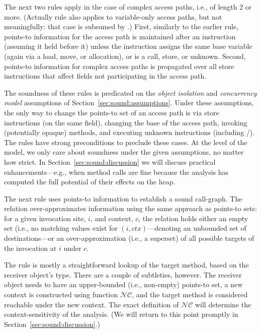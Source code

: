 The next two rules apply in the case of complex access paths, i.e., of length 2 or more. (Actually rule  also applies to variable-only access paths, but not meaningfully: that case is subsumed by .) First, similarly to the earlier rule, points-to information for the access path is maintained after an instruction (assuming it held before it) unless the instruction assigns the same base variable (again via a load, move, or allocation), or is a call, store, or unknown. Second, points-to information for complex access paths is propagated over all store instructions that affect fields not participating in the access path.

The soundness of these rules is predicated on the \emph{object isolation} and \emph{concurrency model} assumptions of Section~\ref{sec:sound:assumptions}. Under these assumptions, the only way to change the points-to set of an access path is via store instructions (on the same field), changing the base of the access path, invoking (potentially opaque) methods, and executing unknown instructions (including /). The rules have strong preconditions to preclude these cases. At the level of the model, we only care about soundness under the given assumptions, no matter how strict. In Section~\ref{sec:sound:discussion} we will discuss practical enhancements---e.g., when method calls are fine because the analysis has computed the full potential of their effects on the heap.


The next rule uses points-to information to establish a sound call-graph. The  relation  over-approximates information using the same approach as points-to sets: for a given invocation site, $i$, and context, $c$, the relation holds either an empty set (i.e., no matching values exist for $(i, ctx)$---denoting an unbounded set of destinations---or an over-approximation (i.e., a superset) of all possible targets of the invocation at $i$ under $c$.

The rule is mostly a straightforward lookup of the target method, based on the receiver object's type. There are a couple of subtleties, however. The receiver object needs to have an upper-bounded (i.e., non-empty) points-to set, a new context is constructed using function $\mathcal{NC}$, and the target method is considered reachable under the new context. The exact definition of $\mathcal{NC}$ will determine the context-sensitivity of the analysis. (We will return to this point promptly in Section~\ref{sec:sound:discussion}.)


